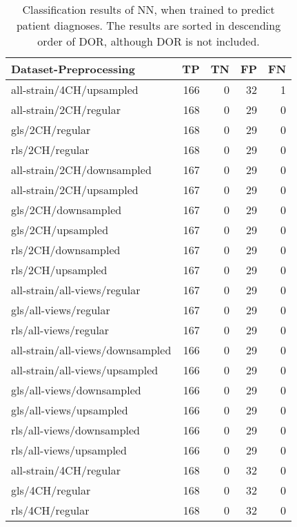 \begin{longtable}{lrrrr}
    \caption{Classification results of NN, when trained to predict patient diagnoses.
             The results are sorted in descending order of DOR, although DOR is not included.}
    \label{tab:dl_ind_raw_results}\\
    \hline
    Dataset-Preprocessing            &  TP &TN & FP & FN \\
    \hline
    all-strain/4CH/upsampled         & 166 & 0 & 32 & 1 \\
    all-strain/2CH/regular           & 168 & 0 & 29 & 0 \\
    gls/2CH/regular                  & 168 & 0 & 29 & 0 \\
    rls/2CH/regular                  & 168 & 0 & 29 & 0 \\
    all-strain/2CH/downsampled       & 167 & 0 & 29 & 0 \\
    all-strain/2CH/upsampled         & 167 & 0 & 29 & 0 \\
    gls/2CH/downsampled              & 167 & 0 & 29 & 0 \\
    gls/2CH/upsampled                & 167 & 0 & 29 & 0 \\
    rls/2CH/downsampled              & 167 & 0 & 29 & 0 \\
    rls/2CH/upsampled                & 167 & 0 & 29 & 0 \\
    all-strain/all-views/regular     & 167 & 0 & 29 & 0 \\
    gls/all-views/regular            & 167 & 0 & 29 & 0 \\
    rls/all-views/regular            & 167 & 0 & 29 & 0 \\
    all-strain/all-views/downsampled & 166 & 0 & 29 & 0 \\
    all-strain/all-views/upsampled   & 166 & 0 & 29 & 0 \\
    gls/all-views/downsampled        & 166 & 0 & 29 & 0 \\
    gls/all-views/upsampled          & 166 & 0 & 29 & 0 \\
    rls/all-views/downsampled        & 166 & 0 & 29 & 0 \\
    rls/all-views/upsampled          & 166 & 0 & 29 & 0 \\
    all-strain/4CH/regular           & 168 & 0 & 32 & 0 \\
    gls/4CH/regular                  & 168 & 0 & 32 & 0 \\
    rls/4CH/regular                  & 168 & 0 & 32 & 0 \\

\end{longtable}

